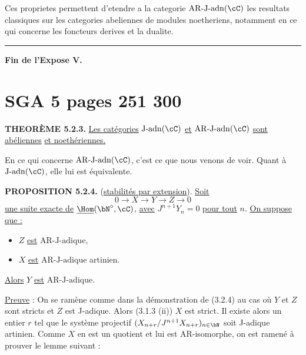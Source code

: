 Ces proprietes permettent d'etendre a la categorie $\mathrm{AR\text{-}J\text{-}adn}(\cC)$ les resultats classiques sur les categories abeliennes de modules noetheriens, notamment en ce qui concerne les foncteurs derives et la dualite.

\bigskip
\hrule
\bigskip

\noindent\textbf{Fin de l'Expose V.}


\clearpage
{}
\section*{SGA 5 pages 251 300}
\setcounter{page}{251}

\noindent
\textbf{THEOR\`EME 5.2.3.} \underline{Les cat\'egories} $\mathrm{J\text{-}adn}(\cC)$ \underline{et} $\mathrm{AR\text{-}J\text{-}adn}(\cC)$ \underline{sont ab\'eliennes} \underline{et noeth\'eriennes.}

En ce qui concerne $\mathrm{AR\text{-}J\text{-}adn}(\cC)$, c'est ce que nous venons de voir. Quant \`a $\mathrm{J\text{-}adn}(\cC)$, elle lui est \'equivalente.

\bigskip

\noindent
\textbf{PROPOSITION 5.2.4.} (\underline{stabilit\'es par extension}). \underline{Soit}
\[
0 \longrightarrow X \longrightarrow Y \longrightarrow Z \longrightarrow 0
\]
\underline{une suite exacte de} $\underline{\Hom}(\bN^{\circ}, \cC)$, \underline{avec} $J^{n+1}Y_n = 0$ \underline{pour tout} $n$. \underline{On suppose que :}
\begin{itemize}
\item[(i)] $Z$ \underline{est} $\mathrm{AR\text{-}J\text{-}adique}$,
\item[(ii)] $X$ \underline{est} $\mathrm{AR\text{-}J\text{-}adique}$ artinien.
\end{itemize}
\underline{Alors} $Y$ \underline{est} $\mathrm{AR\text{-}J\text{-}adique}$.

\smallskip
\noindent
\underline{Preuve} : On se ram\`ene comme dans la d\'emonstration de (3.2.4) au cas o\`u $Y$ et $Z$ sont stricts et $Z$ est J-adique. Alors (3.1.3 (ii)) $X$ est strict. Il existe alors un entier $r$ tel que le syst\`eme projectif $(X_{n+r}/J^{n+1}X_{n+r})_{n \in \bN}$ soit J-adique artinien. Comme $X$ en est un quotient et lui est AR-isomorphe, on est ramen\'e \`a prouver le lemme suivant :

\bigskip

